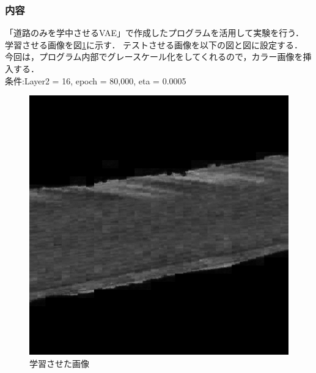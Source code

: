 \documentclass[twocolumn, a4j]{jsarticle}
\begin{document}
\subsubsection{内容}
「道路のみを学中させるVAE」で作成したプログラムを活用して実験を行う．
学習させる画像を図\ref{fig:4-1}に示す．
テストさせる画像を以下の図と図に設定する．
今回は，プログラム内部でグレースケール化をしてくれるので，カラー画像を挿入する．
\\条件:Layer2 = 16, epoch = 80,000, eta = 0.0005
\begin{figure}[h]
  \begin{center}
    \includegraphics[width=0.48\columnwidth]{figure/output_test11.bmp}
  \end{center}
  \caption{学習させた画像}
  \label{fig:4-1}
\end{figure}
\end{document}
